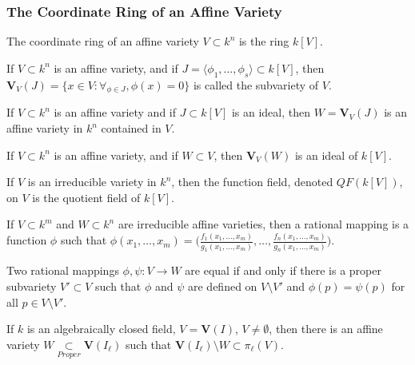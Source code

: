 \documentclass[crop=false,class=article,oneside]{standalone}
\begin{document}
    \subsubsection{The Coordinate Ring of an Affine Variety}
    \begin{definition}
    The coordinate ring of an affine variety $V\subset k^n$ is the ring $k[V]$.
    \end{definition}
    \begin{definition}
    If $V\subset k^n$ is an affine variety, and if $J = \langle \phi_1,\hdots, \phi_s\rangle \subset k[V]$, then $\mathbf{V}_{V}(J) = \{x\in V:\forall_{\phi \in J}, \phi(x) = 0 \}$ is called the subvariety of $V$.
    \end{definition}
    \begin{theorem}
    If $V\subset k^n$ is an affine variety and if $J\subset k[V]$ is an ideal, then $W = \mathbf{V}_{V}(J)$ is an affine variety in $k^n$ contained in $V$.
    \end{theorem}
    \begin{theorem}
    If $V\subset k^n$ is an affine variety, and if $W\subset V$, then $\mathbf{V}_{V}(W)$ is an ideal of $k[V]$.
    \end{theorem}
    \begin{definition}
    If $V$ is an irreducible variety in $k^n$, then the function field, denoted $QF(k[V])$, on $V$ is the quotient field of $k[V]$.
    \end{definition}
    \begin{definition}
    If $V\subset k^m$ and $W\subset k^n$ are irreducible affine varieties, then a rational mapping is a function $\phi$ such that $\phi(x_1,\hdots, x_m) = \bigg(\frac{f_1(x_1,\hdots, x_m)}{g_1(x_1,\hdots, x_m)}, \hdots, \frac{f_n(x_1,\hdots, x_m)}{g_n(x_1,\hdots, x_m)}\bigg)$.
    \end{definition}
    \begin{theorem}
    Two rational mappings $\phi,\psi:V\rightarrow W$ are equal if and only if there is a proper subvariety $V'\subset V$ such that $\phi$ and $\psi$ are defined on $V\setminus V'$ and $\phi(p) = \psi(p)$ for all $p \in V\setminus V'$.
    \end{theorem}
    \begin{theorem}
    If $k$ is an algebraically closed field, $V=\mathbf{V}(I)$, $V\ne \emptyset$, then there is an affine variety $W\underset{Proper}\subset \mathbf{V}(I_{\ell})$ such that $\mathbf{V}(I_{\ell})\setminus W \subset \pi_{\ell}(V)$.
    \end{theorem}
\end{document}
